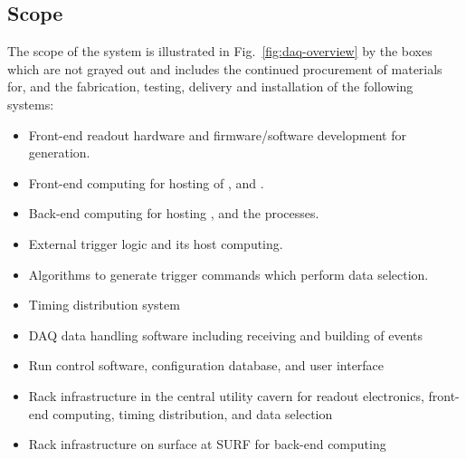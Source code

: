 




\subsection{Scope}
\label{sec:fd-daq-scope}


The scope of the  system is illustrated in
Fig.~\ref{fig:daq-overview} by the boxes which are not grayed out and
includes the continued procurement of materials for, and the
fabrication, testing, delivery and installation of the following
systems:

\begin{itemize}
\item Front-end readout hardware and firmware/software development for  generation.
\item Front-end computing for hosting of ,  and .
\item Back-end computing for hosting ,  and the  processes.
\item External trigger logic and its host computing.
\item Algorithms to generate trigger commands which perform data selection.
\item Timing distribution system
\item DAQ data handling software including receiving and building of
  events
\item Run control software, configuration database, and user interface
\item Rack infrastructure in the central utility cavern for readout
  electronics, front-end computing, timing distribution, and data
  selection
\item Rack infrastructure on surface at SURF for back-end computing
\end{itemize}


